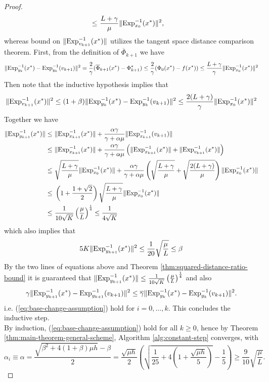 \begin{proof}
\begin{align*}
	\le &~ \frac{L+\gamma}{\mu}\|\mathrm{Exp}_{x_0}^{-1}(x^*)\|^2, 
	\end{align*} 
	whereas bound on $\|\mathrm{Exp}_{v_{k+1}}^{-1}(x^*)\|$ utilizes the tangent space distance comparison theorem. First, from the definition of $\overline{\Phi}_{k+1}$ we have
	$$\|\mathrm{Exp}_{y_k}^{-1}(x^*)-\mathrm{Exp}_{y_k}^{-1}(v_{k+1})\|^2 = \frac{2}{\gamma}(\overline{\Phi}_{k+1}(x^*)-\Phi_{k+1}^*)\le \frac{2}{\gamma}(\Phi_0(x^*)-f(x^*))\le \frac{L+\gamma}{\gamma}\|\mathrm{Exp}_{x_0}^{-1}(x^*)\|^2$$
	Then note that the inductive hypothesis implies that
	\begin{align*}
	\|\mathrm{Exp}_{v_{k+1}}^{-1}(x^*)\|^2\le (1+\beta)\|\mathrm{Exp}_{y_k}^{-1}(x^*)-\mathrm{Exp}_{y_k}^{-1}(v_{k+1})\|^2\le \frac{2(L+\gamma)}{\gamma}\|\mathrm{Exp}_{x_0}^{-1}(x^*)\|^2
	\end{align*}
	Together we have
	\begin{align*}
	\|\mathrm{Exp}_{y_{k+1}}^{-1}(x^*)\|\le ~& \|\mathrm{Exp}_{x_{k+1}}^{-1}(x^*)\| + \frac{\alpha\gamma}{\gamma+\alpha\mu}\|\mathrm{Exp}_{x_{k+1}}^{-1}(v_{k+1})\|\\  \le ~& \|\mathrm{Exp}_{x_{k+1}}^{-1}(x^*)\| + \frac{\alpha\gamma}{\gamma+\alpha\mu}\left(\|\mathrm{Exp}_{x_{k+1}}^{-1}(x^*)\| + \|\mathrm{Exp}_{v_{k+1}}^{-1}(x^*)\|\right) \\
	\le ~& \sqrt{\frac{L+\gamma}{\mu}}\|\mathrm{Exp}_{x_0}^{-1}(x^*)\| + \frac{\alpha\gamma}{\gamma+\alpha\mu}\left(\sqrt{\frac{L+\gamma}{\mu}}+\sqrt{\frac{2(L+\gamma)}{\mu}}\right)\|\mathrm{Exp}_{x_0}^{-1}(x^*)\| \\
	\le ~& \left(1 + \frac{1+\sqrt{2}}{2}\right)\sqrt{\frac{L+\gamma}{\mu}}\|\mathrm{Exp}_{x_0}^{-1}(x^*)\| \\
	\le ~& \frac{1}{10\sqrt{K}}\left(\frac{\mu}{L}\right)^{\frac{1}{4}} 
	\le \frac{1}{4\sqrt{K}}
	\end{align*}
	which also implies that
	$$ 5K\|\mathrm{Exp}_{y_{k+1}}^{-1}(x^*)\|^2 \le \frac{1}{20}\sqrt{\frac{\mu}{L}} \le \beta$$
	By the two lines of equations above and Theorem \ref{thm:squared-distance-ratio-bound} it is guaranteed that $\|\mathrm{Exp}_{y_{k+1}}^{-1}(x^*)\|\le \frac{1}{10\sqrt{K}}\left(\frac{\mu}{L}\right)^{\frac{1}{4}}$ and also
	$$\gamma \| \mathrm{Exp}_{y_{k+1}}^{-1}(x^*) -\mathrm{Exp}_{y_{k+1}}^{-1}(v_{k+1})\|^2 \le \overline{\gamma} \|\mathrm{Exp}_{y_k}^{-1}(x^*)-\mathrm{Exp}_{y_k}^{-1}(v_{k+1})\|^2.$$
	i.e. (\ref{eq:base-change-assumption}) hold for $i=0,\dots,k$. This concludes the inductive step.\\
	By induction, (\ref{eq:base-change-assumption}) hold for all $k\ge 0$, hence by Theorem \ref{thm:main-theorem-general-scheme}, Algorithm \ref{alg:constant-step} converges, with
	$$\alpha_i\equiv \alpha=\frac{\sqrt{\beta^2+4(1+\beta)\mu h}-\beta}{2} = \frac{\sqrt{\mu h}}{2}\left(\sqrt{\frac{1}{25}+4\left(1+\frac{\sqrt{\mu h}}{5}\right)} - \frac{1}{5}\right)\ge \frac{9}{10}\sqrt{\frac{\mu}{L}}.$$
\end{proof}


